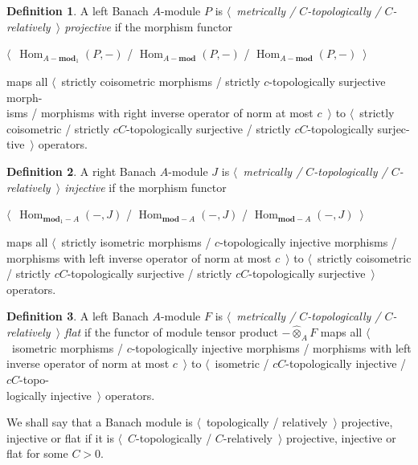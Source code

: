 \documentclass{article}
\theoremstyle{plain}
\theoremstyle{definition}
\newtheorem{definition}{Definition}
\newcommand{\projtens}{\mathbin{\widehat{\otimes}}}
\begin{document}
\begin{fulltext}
\begin{definition} A left Banach $A$-module $P$ is \emph{$\langle$~metrically /
$C$-topologically / $C$-relatively~$\rangle$ projective} if the morphism functor
\begin{center}
$\langle$~$\operatorname{Hom}_{A-\mathbf{mod}_1}(P,-)$ /
$\operatorname{Hom}_{A-\mathbf{mod}}(P,-)$ /
$\operatorname{Hom}_{A-\mathbf{mod}}(P,-)$~$\rangle$
\end{center}
maps all $\langle$~strictly coisometric morphisms / strictly $c$-topologically
surjective morph-\\isms / morphisms with right inverse operator of norm at most
$c$~$\rangle$ to $\langle$~strictly coisometric / strictly $c C$-topologically
surjective / strictly $c C$-topologically surjec-\\tive~$\rangle$ operators.
\end{definition}

\begin{definition} A right Banach $A$-module $J$ is \emph{$\langle$~metrically /
$C$-topologically / $C$-relatively~$\rangle$ injective} if the morphism functor
\begin{center}
$\langle$~$\operatorname{Hom}_{\mathbf{mod}_1-A}(-,J)$ /
$\operatorname{Hom}_{\mathbf{mod}-A}(-,J)$ /
$\operatorname{Hom}_{\mathbf{mod}-A}(-,J)$~$\rangle$    
\end{center}
maps all $\langle$~strictly isometric morphisms / $c$-topologically injective
morphisms / morphisms with left inverse operator of norm at most $c$~$\rangle$
to $\langle$~strictly coisometric / strictly $c C$-topologically surjective /
strictly $c C$-topologically surjective~$\rangle$ operators.
\end{definition}

\begin{definition} A left Banach $A$-module $F$ is \emph{$\langle$~metrically /
$C$-topologically / $C$-relatively~$\rangle$ flat} if the functor of module
tensor product $-\projtens_A F$ maps all $\langle$~isometric morphisms /
$c$-topologically injective morphisms / morphisms with left inverse operator of
norm at most $c$~$\rangle$ to $\langle$~isometric / $cC$-topologically injective
/ $cC$-topo-\\logically injective~$\rangle$ operators.
\end{definition}

We shall say that a Banach module is $\langle$~topologically /
relatively~$\rangle$ projective, injective or flat if it is
$\langle$~$C$-topologically / $C$-relatively~$\rangle$ projective, injective or
flat for some $C>0$.


\end{fulltext}
\end{document}
